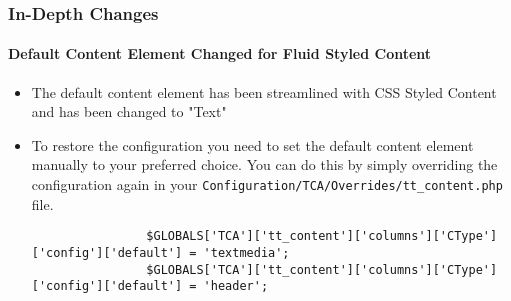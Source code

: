 
\begin{frame}[fragile]
	\frametitle{In-Depth Changes}
	\framesubtitle{Default Content Element Changed for Fluid Styled Content}

	\lstset{basicstyle=\tiny\ttfamily}

	\begin{itemize}
		\item The default content element has been streamlined with CSS Styled Content and has been changed to "Text"
		\item To restore the configuration you need to set the default content element manually to your preferred choice.
			You can do this by simply overriding the configuration again in your
			\texttt{Configuration/TCA/Overrides/tt\_content.php} file.

			\begin{lstlisting}
				$GLOBALS['TCA']['tt_content']['columns']['CType']['config']['default'] = 'textmedia';
				$GLOBALS['TCA']['tt_content']['columns']['CType']['config']['default'] = 'header';
			\end{lstlisting}

	\end{itemize}

\end{frame}


